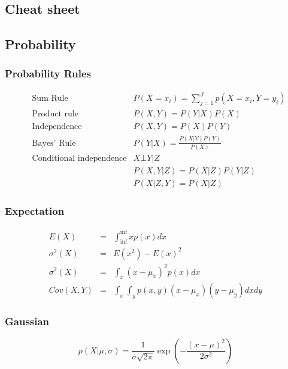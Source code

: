 \documentclass[MachineLearning]{subfiles}
\begin{document}
\begin{landscape}
\section{Cheat sheet}
%
%
\begin{multicols}{3}
\scriptsize
\subsection{Probability}
\subsubsection{Probability Rules}
\begin{eqnarray}
&\text{Sum Rule}& P(X=x_i) = \sum_{j=1}^{J} p(X=x_i,Y=y_i)\\
&\text{Product rule}& P(X, Y) = P(Y|X) P(X) \\
&\text{Independence}& P(X, Y) = P(X)P(Y) \\
&\text{Bayes' Rule}& P(Y|X) = \frac{P(X|Y)P(Y)}{P(X)} \\
&\text{Conditional independence}& X\bot Y|Z \\
& & P(X,Y|Z) = P(X|Z)P(Y|Z) \\
& & P(X|Z,Y) = P(X|Z)
\end{eqnarray}
\subsubsection{Expectation}
\begin{eqnarray}
E(X) &=& \int_{\inf}^{\inf} x p(x) dx \\
\sigma^2(X) &=& E(x^2)-{E(x)}^2 \\
\sigma^2(X) &=& \int_x (x-\mu_x)^2 p(x) dx \\
Cov(X, Y) &=& \int_x \int_y p(x,y) (x-\mu_x)(y-\mu_y) dx dy
\end{eqnarray}

\subsubsection{Gaussian}
\begin{equation}
p(X|\mu,\sigma)=\frac{1}{\sigma \sqrt{2\pi}} \exp(-\frac{(x-\mu)^2}{2\sigma^2})
\end{equation}


\end{multicols}
\end{landscape}
\end{document}
